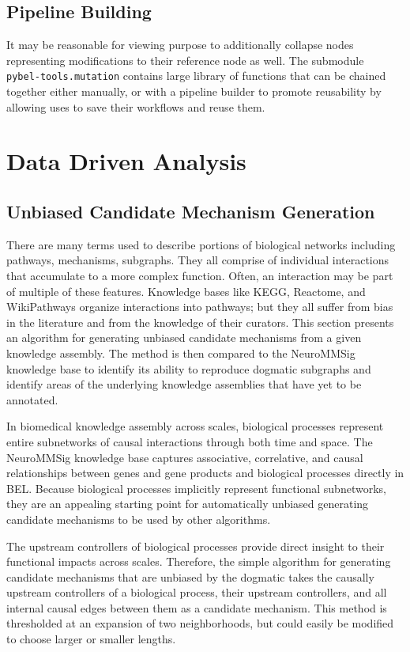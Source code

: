 \subsection{Pipeline Building}

It may be reasonable for viewing purpose to additionally collapse nodes representing modifications to their reference node as well. The submodule \\ 
\verb|pybel-tools.mutation| contains large library of functions that can be chained together either manually, or with a pipeline builder to promote reusability by allowing uses to save their workflows and reuse them. 

\section{Data Driven Analysis}

\subsection{Unbiased Candidate Mechanism Generation}

There are many terms used to describe portions of biological networks including pathways, mechanisms, subgraphs. They all comprise of individual interactions that accumulate to a more complex function. Often, an interaction may be part of multiple of these features. Knowledge bases like \ac{KEGG}, Reactome, and WikiPathways organize interactions into pathways; but they all suffer from bias in the literature and from the knowledge of their curators. This section presents an algorithm for generating unbiased candidate mechanisms from a given knowledge assembly. The method is then compared to the NeuroMMSig knowledge base to identify its ability to reproduce dogmatic subgraphs and identify areas of the underlying knowledge assemblies that have yet to be annotated.

In biomedical knowledge assembly across scales, biological processes represent entire subnetworks of causal interactions through both time and space. The \ac{NeuroMMSig} knowledge base captures associative, correlative,  and causal relationships between genes and gene products and biological processes directly in BEL. Because biological processes implicitly represent functional subnetworks, they are an appealing starting point for automatically unbiased generating candidate mechanisms to be used by other algorithms. 

The upstream controllers of biological processes provide direct insight to their functional impacts across scales. Therefore, the simple algorithm for generating candidate mechanisms that are unbiased by the dogmatic  takes the causally upstream controllers of a biological process, their upstream controllers, and all internal causal edges between them as a candidate mechanism. This method is thresholded at an expansion of two neighborhoods, but could easily be modified to choose larger or smaller lengths.

